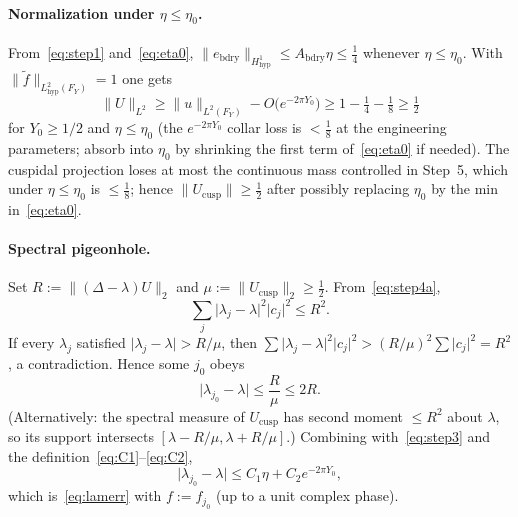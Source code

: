 \documentclass[11pt]{amsart}
\theoremstyle{definition}
\newcommand{\abs}[1]{\lvert#1\rvert}
\newcommand{\norm}[1]{\lVert#1\rVert}
\begin{document}
\paragraph{Normalization under $\eta\le\eta_0$.}
From~\eqref{eq:step1} and~\eqref{eq:eta0},
$\norm{e_{\mathrm{bdry}}}_{H^1_{\mathrm{hyp}}}\le A_{\mathrm{bdry}}\eta
\le \tfrac14$ whenever $\eta\le\eta_0$.  With
$\norm{\widetilde f}_{L^2_{\mathrm{hyp}}(F_Y)}=1$ one gets
\begin{equation}
\label{eq:step4b}
  \norm{U}_{L^2}
  \ge
  \norm{u}_{L^2(F_Y)}
  -
  O\bigl(e^{-2\pi Y_0}\bigr)
  \ge
  1-\tfrac14-\tfrac18
  \ge
  \tfrac12
  \tag{4b}
\end{equation}
for $Y_0\ge 1/2$ and $\eta\le\eta_0$ (the $e^{-2\pi Y_0}$ collar loss is
$<\tfrac18$ at the engineering parameters; absorb into $\eta_0$ by
shrinking the first term of~\eqref{eq:eta0} if needed).  The cuspidal
projection loses at most the continuous mass controlled in Step~5, which
under $\eta\le\eta_0$ is $\le\tfrac18$; hence
$\norm{U_{\mathrm{cusp}}}\ge\tfrac12$ after possibly replacing $\eta_0$ by
the min in~\eqref{eq:eta0}.

\paragraph{Spectral pigeonhole.}
Set $R:=\norm{(\Delta-\lambda)U}_2$ and $\mu:=\norm{U_{\mathrm{cusp}}}_2\ge\tfrac12$.
From~\eqref{eq:step4a},
\begin{equation}
\label{eq:step4c}
  \sum_j \abs{\lambda_j-\lambda}^2\abs{c_j}^2
  \le
  R^2.
  \tag{4c}
\end{equation}
If every $\lambda_j$ satisfied $\abs{\lambda_j-\lambda}>R/\mu$, then
$\sum\abs{\lambda_j-\lambda}^2\abs{c_j}^2>(R/\mu)^2\sum\abs{c_j}^2=R^2$, a
contradiction.  Hence some $j_0$ obeys
\begin{equation}
\label{eq:step4d}
  \abs{\lambda_{j_0}-\lambda}
  \le
  \frac{R}{\mu}
  \le
  2R.
  \tag{4d}
\end{equation}
(Alternatively: the spectral measure of $U_{\mathrm{cusp}}$ has second
moment $\le R^2$ about $\lambda$, so its support intersects
$[\lambda-R/\mu,\lambda+R/\mu]$.)  Combining with~\eqref{eq:step3} and the
definition~\eqref{eq:C1}--\eqref{eq:C2},
\begin{equation}
\label{eq:step4}
  \abs{\lambda_{j_0}-\lambda}
  \le
  C_1\eta+C_2 e^{-2\pi Y_0},
  \tag{4}
\end{equation}
which is~\eqref{eq:lamerr} with $f:=f_{j_0}$ (up to a unit complex phase).
\end{document}
